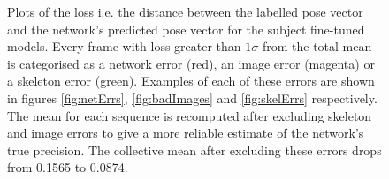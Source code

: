 \documentclass[11pt]{article} %
\begin{document}
\begin{figure}
\ContinuedFloat
\centering
%
\qquad
{}%
\caption{Plots of the loss i.e. the distance between the labelled pose vector and the network's predicted pose vector for the subject fine-tuned models. Every frame with loss greater than $1\sigma$ from the total mean is categorised as a network error (red), an image error (magenta) or a skeleton error (green). Examples of each of these errors are shown in figures \ref{fig:netErrs}, \ref{fig:badImages} and \ref{fig:skelErrs} respectively. The mean for each sequence is recomputed after excluding skeleton and image errors to give a more reliable estimate of the network's true precision. The collective mean after excluding these errors drops from 0.1565 to 0.0874. }
\label{fig:classedErr}
\end{figure}
\end{document}
